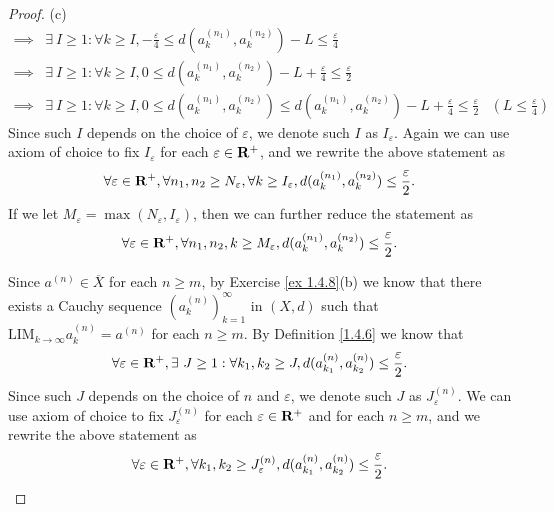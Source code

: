 \begin{proof}{(c)}
\begin{align*}
        \implies & \exists\ I \geq 1 : \forall k \geq I, -\frac{\varepsilon}{4} \leq d(a_k^{(n_1)}, a_k^{(n_2)}) - L \leq \frac{\varepsilon}{4}                                                                      \\
        \implies & \exists\ I \geq 1 : \forall k \geq I, 0 \leq d(a_k^{(n_1)}, a_k^{(n_2)}) - L + \frac{\varepsilon}{4} \leq \frac{\varepsilon}{2}                                                                   \\
        \implies & \exists\ I \geq 1 : \forall k \geq I, 0 \leq d(a_k^{(n_1)}, a_k^{(n_2)}) \leq d(a_k^{(n_1)}, a_k^{(n_2)}) - L + \frac{\varepsilon}{4} \leq \frac{\varepsilon}{2} & (L \leq \frac{\varepsilon}{4})
    \end{align*}
    Since such \(I\) depends on the choice of \(\varepsilon\), we denote such \(I\) as \(I_\varepsilon\).
    Again we can use axiom of choice to fix \(I_\varepsilon\) for each \(\varepsilon \in \mathbf{R}^+\), and we rewrite the above statement as
    \[
        \forall \varepsilon \in \mathbf{R}^+, \forall n_1, n_2 \geq N_\varepsilon, \forall k \geq I_\varepsilon, d(a_k^{(n_1)}, a_k^{(n_2)}) \leq \frac{\varepsilon}{2}.
    \]
    If we let \(M_\varepsilon = \max(N_\varepsilon, I_\varepsilon)\), then we can further reduce the statement as
    \[
        \forall \varepsilon \in \mathbf{R}^+, \forall n_1, n_2, k \geq M_\varepsilon, d(a_k^{(n_1)}, a_k^{(n_2)}) \leq \frac{\varepsilon}{2}.
    \]

    Since \(a^{(n)} \in \overline{X}\) for each \(n \geq m\), by Exercise \ref{ex 1.4.8}(b) we know that there exists a Cauchy sequence \((a_k^{(n)})_{k = 1}^\infty\) in \((X, d)\) such that \(\text{LIM}_{k \to \infty} a_k^{(n)} = a^{(n)}\) for each \(n \geq m\).
    By Definition \ref{1.4.6} we know that
    \[
        \forall \varepsilon \in \mathbf{R}^+, \exists\ J \geq 1 : \forall k_1, k_2 \geq J, d(a_{k_1}^{(n)}, a_{k_2}^{(n)}) \leq \frac{\varepsilon}{2}.
    \]
    Since such \(J\) depends on the choice of \(n\) and \(\varepsilon\), we denote such \(J\) as \(J_\varepsilon^{(n)}\).
    We can use axiom of choice to fix \(J_\varepsilon^{(n)}\) for each \(\varepsilon \in \mathbf{R}^+\) and for each \(n \geq m\), and we rewrite the above statement as
    \[
        \forall \varepsilon \in \mathbf{R}^+, \forall k_1, k_2 \geq J_\varepsilon^{(n)}, d(a_{k_1}^{(n)}, a_{k_2}^{(n)}) \leq \frac{\varepsilon}{2}.
    \]


\end{proof}
